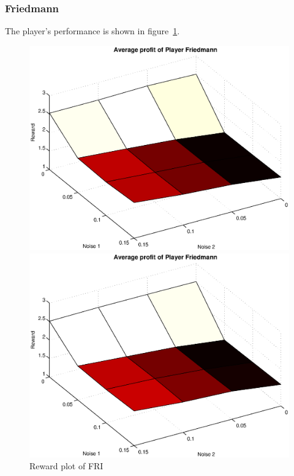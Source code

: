 \subsubsection{Friedmann}
The player's performance is shown in figure~\ref{pic player friedmann}.\\
\begin{figure}[h]
	\caption{Reward plot of FRI}
	\label{pic player friedmann}
\begin{minipage}[hbt]{0.65\textwidth}
	\centering
	\includegraphics[width=\textwidth]{pics/simulation1/Reward_vs_Noise_of_Player_Friedmann}
\end{minipage}
\hfill
\begin{minipage}[hbt]{0.3\textwidth}
	\centering
	\includegraphics[width=\textwidth]{pics/simulation2/Reward_vs_Noise_of_Player_Friedmann}
\end{minipage}

\end{figure}

